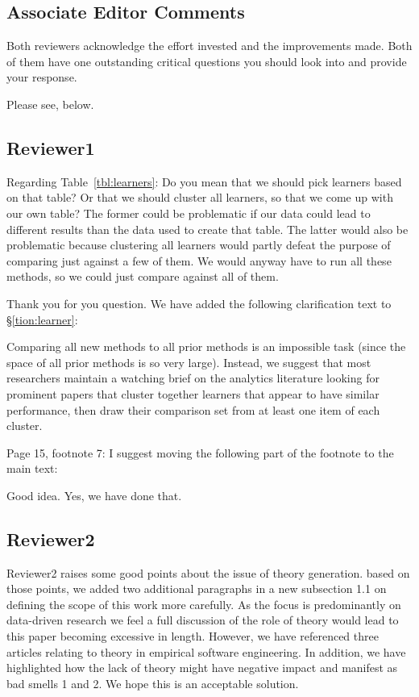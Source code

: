 \documentclass[10pt]{elsarticle}
\newcommand{\RRED}{\color{red}}
\newcommand{\BLACK}{\color{black}}
\newcommand{\tion}[1]{\S\ref{tion:#1}}
\begin{document}
\subsection*{Associate Editor Comments}

Both reviewers acknowledge the effort invested and the improvements made. Both of them have one outstanding critical questions you should look into and provide your response.

\RRED

Please see, below.
\BLACK

\subsection*{Reviewer1}

Regarding Table~\ref{tbl:learners}: Do you mean that we should pick learners based on that table? Or that we should cluster all learners, so that we come up with our own table? The former could be problematic if our data could lead to different results than the data used to create that table. The latter would also be problematic because clustering all learners would partly defeat the purpose of comparing just against a few of them. We would anyway have to run all these methods, so we could just compare against all of them.  

\RRED
Thank you for you question. We have added the following clarification text to
\tion{learner}:

Comparing all new methods to all prior methods is an impossible task (since the space
of all prior methods is so very large). Instead, we suggest  that most researchers maintain a watching
brief on the analytics literature looking for prominent papers that cluster together learners
that appear to have similar performance, then draw their comparison set from at least one
item of each cluster.  
\BLACK

Page 15, footnote 7: I suggest moving the following part of the footnote to the main text:

\RRED
Good idea. Yes, we have done that.
\BLACK
\subsection*{Reviewer2}

\RRED
Reviewer2 raises some good points about the issue of theory generation.
based on those points, we added two additional paragraphs in a new subsection 1.1 on defining the scope of this work more carefully.  As the focus is predominantly on data-driven research we feel a full discussion of the role of theory would lead to this paper becoming excessive in length.  However, we have referenced three articles relating to theory in empirical software engineering. In addition, we have highlighted how the lack of theory might have negative impact and manifest as bad smells 1 and 2.  We hope this is an acceptable solution.
\BLACK
\end{document}
